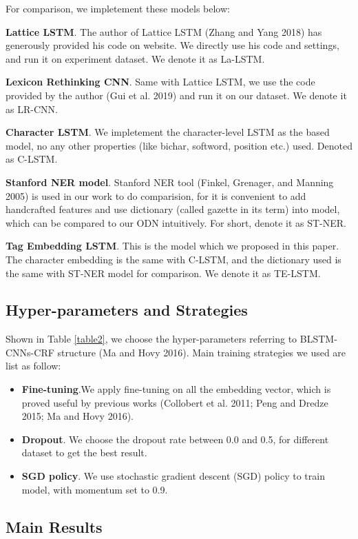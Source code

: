 \documentclass[letterpaper]{article} %
\begin{document}
For comparison, we impletement these models below:

\textbf{Lattice LSTM}. The author of Lattice LSTM (Zhang and Yang 2018) has generously provided his code on website. We directly use his code and settings, and run it on experiment dataset. We denote it as La-LSTM.

\textbf{Lexicon Rethinking CNN}. Same with Lattice LSTM, we use the code provided by the author (Gui et al. 2019) and run it on our dataset. We denote it as LR-CNN.

\textbf{Character LSTM}. We impletement the character-level LSTM as the based model, no any other properties (like bichar, softword, position etc.) used. Denoted as C-LSTM.

\textbf{Stanford NER model}. Stanford NER tool (Finkel, Grenager, and Manning 2005) is used in our work to do comparision, for it is convenient to add handcrafted features and use dictionary (called gazette in its term) into model, which can be compared to our ODN intuitively. For short, denote it as ST-NER. 

\textbf{Tag Embedding LSTM}. This is the model which we proposed in this paper. The character embedding is the same with C-LSTM, and the dictionary used is the same with ST-NER model for comparison. We denote it as TE-LSTM.

\subsection{Hyper-parameters and Strategies}

Shown in Table \ref{table2}, we choose the hyper-parameters referring to BLSTM-CNNs-CRF structure (Ma and Hovy 2016). Main training strategies we used are list as follow:

\begin{itemize}
\item \textbf{Fine-tuning}.We apply fine-tuning on all the embedding vector, which is proved useful by previous works (Collobert et al. 2011; Peng and Dredze 2015; Ma and Hovy 2016). 
\item \textbf{Dropout}. We choose the dropout rate between 0.0 and 0.5, for different dataset to get the best result.
\item \textbf{SGD policy}. We use stochastic gradient descent (SGD) policy to train model, with momentum set to 0.9.
\end{itemize}

\subsection{Main Results}
\end{document}
